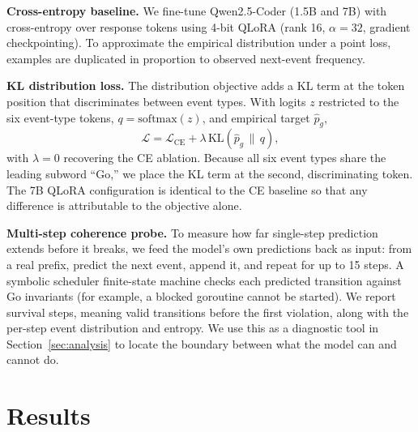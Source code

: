 \documentclass{svproc}
\begin{document}
\textbf{Cross-entropy baseline.}
We fine-tune Qwen2.5-Coder (1.5B and 7B) with cross-entropy over
response tokens using 4-bit QLoRA (rank 16, $\alpha{=}32$, gradient
checkpointing). To approximate the empirical distribution under a point
loss, examples are duplicated in proportion to observed next-event
frequency.

\textbf{KL distribution loss.}
The distribution objective adds a KL term at the token position that
discriminates between event types. With logits $z$ restricted to the
six event-type tokens, $q=\mathrm{softmax}(z)$, and empirical target
$\hat p_g$,
\begin{equation}
\mathcal{L}=\mathcal{L}_{\mathrm{CE}}+\lambda\,\mathrm{KL}(\hat p_g \,\|\, q),
\end{equation}
with $\lambda{=}0$ recovering the CE ablation. Because all six event
types share the leading subword ``Go,'' we place the KL term at the
second, discriminating token. The 7B QLoRA configuration is identical
to the CE baseline so that any difference is attributable to the
objective alone.

\textbf{Multi-step coherence probe.}
To measure how far single-step prediction extends before it breaks, we
feed the model's own predictions back as input: from a real prefix,
predict the next event, append it, and repeat for up to 15 steps. A
symbolic scheduler finite-state machine checks each predicted transition
against Go invariants (for example, a blocked goroutine cannot be
started). We report survival steps, meaning valid transitions before
the first violation, along with the per-step event distribution and
entropy. We use this as a diagnostic tool in Section~\ref{sec:analysis}
to locate the boundary between what the model can and cannot do.

\section{Results}\label{sec:results}
\end{document}

